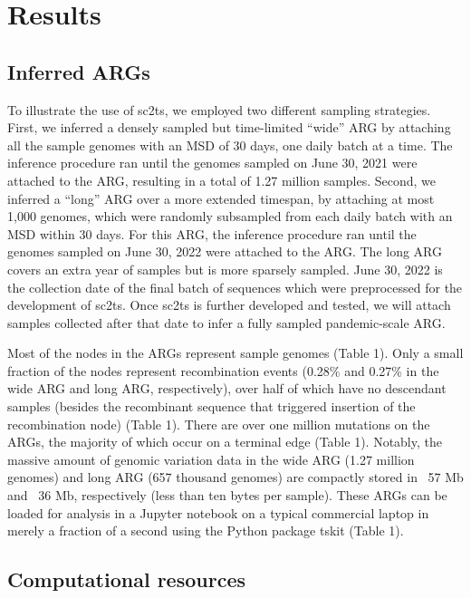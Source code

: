 \documentclass{article}
\begin{document}
\section{Results}

\subsection{Inferred ARGs}

To illustrate the use of sc2ts, we employed two different sampling strategies.
First, we inferred a densely sampled but time-limited “wide” ARG by attaching
all the sample genomes with an MSD of 30 days, one daily batch at a time. The
inference procedure ran until the genomes sampled on June 30, 2021 were
attached to the ARG, resulting in a total of 1.27 million samples. Second, we
inferred a “long” ARG over a more extended timespan, by attaching at most 1,000
genomes, which were randomly subsampled from each daily batch with an MSD
within 30 days. For this ARG, the inference procedure ran until the genomes
sampled on June 30, 2022 were attached to the ARG. The long ARG covers an extra
year of samples but is more sparsely sampled. June 30, 2022 is the collection
date of the final batch of sequences which were preprocessed for the
development of sc2ts. Once sc2ts is further developed and tested, we will
attach samples collected after that date to infer a fully sampled
pandemic-scale ARG.

Most of the nodes in the ARGs represent sample genomes (Table 1). Only a small
fraction of the nodes represent recombination events (0.28\% and 0.27\% in the
wide ARG and long ARG, respectively), over half of which have no descendant
samples (besides the recombinant sequence that triggered insertion of the
recombination node) (Table 1). There are over one million mutations on the
ARGs, the majority of which occur on a terminal edge (Table 1). Notably, the
massive amount of genomic variation data in the wide ARG (1.27 million genomes)
and long ARG (657 thousand genomes) are compactly stored in ~57 Mb and ~36 Mb,
respectively (less than ten bytes per sample). These ARGs can be loaded for
analysis in a Jupyter notebook on a typical commercial laptop in merely a
fraction of a second using the Python package tskit (Table 1).

\subsection{Computational resources}
\end{document}
